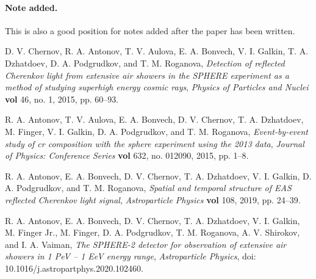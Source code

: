 \documentclass[a4paper,11pt]{article}
\begin{document}
\paragraph{Note added.} This is also a good position for notes added
after the paper has been written.



\begin{thebibliography}{99}

D. V. Chernov, R. A. Antonov, T. V. Aulova, E. A. Bonvech, V. I. Galkin, T. A. Dzhatdoev, D. A. Podgrudkov, and T. M. Roganova, \emph{Detection of reflected Cherenkov light from extensive air showers in the SPHERE experiment as a method of studying superhigh energy cosmic rays}, \emph{Physics of Particles and Nuclei} {\bf vol} 46, no. 1, 2015, pp. 60–93.

R. A. Antonov, T. V. Aulova, E. A. Bonvech, D. V. Chernov, T. A. Dzhatdoev, M. Finger, V. I. Galkin, D. A. Podgrudkov, and T. M. Roganova, \emph{Event-by-event study of cr composition with the sphere experiment using the 2013 data}, \emph{Journal of Physics: Conference Series} {\bf vol} 632, no. 012090, 2015, pp. 1–8.

R. A. Antonov, E. A. Bonvech, D. V. Chernov, T. A. Dzhatdoev, V. I. Galkin, D. A. Podgrudkov, and T. M. Roganova, \emph{Spatial and temporal structure of EAS reflected Cherenkov light signal}, \emph{Astroparticle Physics} {\bf vol} 108, 2019, pp. 24–39.

R. A. Antonov, E. A. Bonvech, D. V. Chernov, T. A. Dzhatdoev, V. I. Galkin, M. Finger Jr., M. Finger, D. A. Podgrudkov, T. M. Roganova,  A. V. Shirokov, and I. A. Vaiman, 
\emph{The SPHERE-2 detector for observation of extensive air showers in 1 PeV – 1 EeV energy range}, \emph{Astroparticle Physics},
doi: 10.1016/j.astropartphys.2020.102460.




\end{thebibliography}
\end{document}
